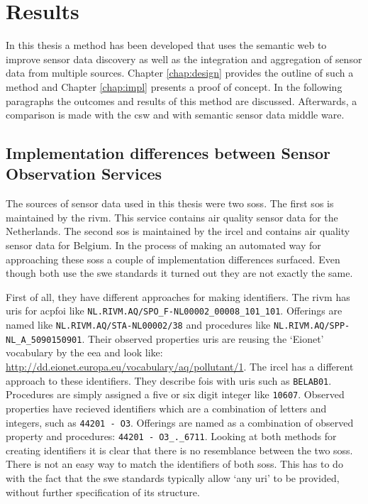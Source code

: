 

\chapter{Results}
\label{chap:results}

In this thesis a method has been developed that uses the semantic web to improve sensor data discovery as well as the integration and aggregation of sensor data from multiple sources. Chapter \ref{chap:design} provides the outline of such a method and Chapter \ref{chap:impl} presents a proof of concept. In the following paragraphs the outcomes and results of this method are discussed. Afterwards, a comparison is made with the \acf{csw} and with semantic sensor data middle ware. 

\section{Implementation differences between Sensor Observation Services}
The sources of sensor data used in this thesis were two \aclp{sos}. The first \ac{sos} is maintained by the \acf{rivm}. This service contains air quality sensor data for the Netherlands. The second \ac{sos} is maintained by the \ac{ircel} and contains air quality sensor data for Belgium. In the process of making an automated way for approaching these \aclp{sos} a couple of implementation differences surfaced. Even though both use the \ac{swe} standards it turned out they are not exactly the same. 

\begin{sloppypar}
	First of all, they have different approaches for making identifiers. The \ac{rivm} has \acp{uri} for acp{foi} like \texttt{NL.RIVM.AQ/SPO\_F-NL00002\_00008\_101\_101}. Offerings are named like \texttt{NL.RIVM.AQ/STA-NL00002/38} and procedures like \texttt{NL.RIVM.AQ/SPP-NL\_A\_5090150901}. Their observed properties \acp{uri} are reusing the `Eionet' vocabulary by the \ac{eea} and look like: \url{http://dd.eionet.europa.eu/vocabulary/aq/pollutant/1}. The \ac{ircel} has a different approach to these identifiers. They describe \acp{foi} with \acp{uri} such as \texttt{BELAB01}. Procedures are simply assigned a five or six digit integer like \texttt{10607}. Observed properties have recieved identifiers which are a combination of letters and integers, such as \texttt{44201 - O3}. Offerings are named as a combination of observed property and procedures: \texttt{44201 - O3\_.\_6711}. Looking at both methods for creating identifiers it is clear that there is no resemblance between the two \aclp{sos}. There is not an easy way to match the identifiers of both \aclp{sos}. This has to do with the fact that the \ac{swe} standards typically allow `any \ac{uri}' to be provided, without further specification of its structure. 
\end{sloppypar}

